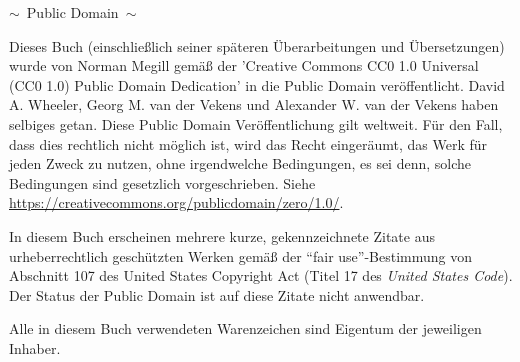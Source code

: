 \begin{center}
$\sim$\ {\sc Public Domain}\ $\sim$

\vspace{2ex}
Dieses Buch (einschließlich seiner späteren Überarbeitungen und Übersetzungen) wurde von Norman Megill gemäß der 'Creative Commons CC0 1.0 Universal (CC0 1.0) Public Domain Dedication' in die Public Domain veröffentlicht.
David A. Wheeler, Georg M. van der Vekens und Alexander W. van der Vekens haben selbiges getan. Diese Public Domain Veröffentlichung gilt weltweit. Für den Fall, dass dies rechtlich nicht möglich ist, wird das Recht eingeräumt, das Werk für jeden Zweck zu nutzen, ohne irgendwelche Bedingungen, es sei denn, solche Bedingungen sind gesetzlich vorgeschrieben.
Siehe \url{https://creativecommons.org/publicdomain/zero/1.0/}.

\vspace{3ex}
In diesem Buch erscheinen mehrere kurze, gekennzeichnete Zitate aus urheberrechtlich geschützten Werken gemäß der "`fair use"'-Bestimmung von Abschnitt 107 des United States Copyright Act (Titel 17 des {\em United States Code}). Der Status der Public Domain ist auf diese Zitate nicht anwendbar.

\vspace{3ex}
Alle in diesem Buch verwendeten Warenzeichen sind Eigentum der jeweiligen Inhaber.


%
%
%
%


\end{center}
